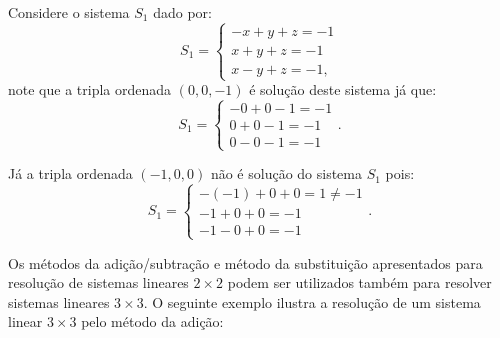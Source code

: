 \begin{exem}
 Considere o sistema $S_1$ dado por:
 \[S_1= \begin{cases}
      -x + y + z= -1 \\
      x + y + z= -1 \\
      x - y + z= -1,
     \end{cases}\]
 note que a tripla ordenada $(0, 0, -1)$ é solução deste sistema já que:
 \[S_1= \begin{cases}
      - 0 + 0 -1 = -1 \\
      0 + 0 -1 = -1\\
      0 - 0 -1 = -1
     \end{cases} .\]

Já a tripla ordenada $(-1, 0, 0)$ não é solução do sistema $S_1$ pois:
\[S_1= \begin{cases}
      -(-1) + 0 + 0= 1 \neq -1 \\
      -1 + 0 + 0 = -1 \\
      -1 -0 + 0 = -1
     \end{cases} .\]
\end{exem}

Os métodos da adição/subtração e método da substituição apresentados para resolução de sistemas lineares $2 \times 2$ podem ser utilizados também para resolver sistemas lineares $3 \times 3$. O seguinte exemplo ilustra a resolução de um sistema linear $3 \times 3$ pelo método da adição:

